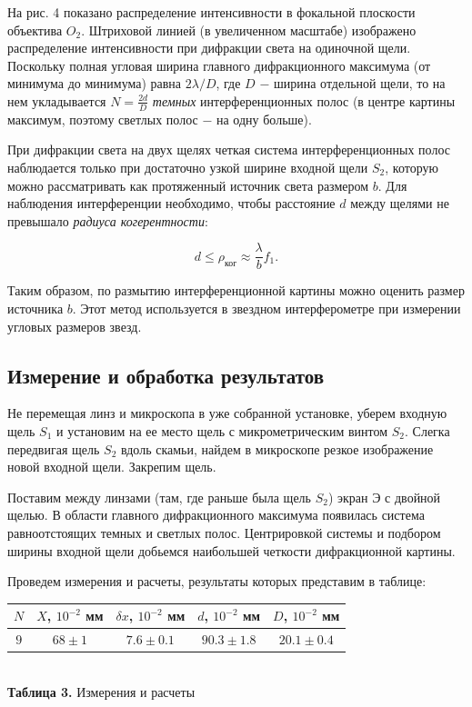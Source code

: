 \documentclass[a4paper,12pt]{article} %
\begin{document}
\hfill \break На рис. 4 показано распределение интенсивности в фокальной плоскости объектива $O_2$. Штриховой линией (в увеличенном масштабе) изображено распределение интенсивности при дифракции света на одиночной щели. Поскольку полная угловая ширина главного дифракционного максимума (от минимума до минимума) равна $2\lambda/D$, где $D$ $-$ ширина отдельной щели, то на нем укладывается $N = \frac {2d} {D}$ \textit{темных} интерференционных полос (в центре картины максимум, поэтому светлых полос $-$ на одну больше).

\hfill \break При дифракции света на двух щелях четкая система интерференционных полос наблюдается только при достаточно узкой ширине входной щели $S_2$, которую можно рассматривать как протяженный источник света размером $b$. Для наблюдения интерференции необходимо, чтобы расстояние $d$ между щелями не превышало \textit{радиуса когерентности}:

\begin{equation}\label{ linkname }
d \le \rho_{\text{ког}} \approx \frac{\lambda}{b} f_1.
\end{equation}

\hfill \break Таким образом, по размытию интерференционной картины можно оценить размер источника $b$. Этот метод используется в звездном интерферометре при измерении угловых размеров звезд.

\subsection{Измерение и обработка результатов}

\hfill \break Не перемещая линз и микроскопа в уже собранной установке, уберем входную щель $S_1$ и установим на ее место щель с микрометрическим винтом $S_2$. Слегка передвигая щель $S_2$ вдоль скамьи, найдем в микроскопе резкое изображение новой входной щели. Закрепим щель.

\hfill \break Поставим между линзами (там, где раньше была щель $S_2$) экран Э с двойной щелью. В области главного дифракционного максимума появилась система равноотстоящих темных и светлых полос. Центрировкой системы и подбором ширины входной щели добьемся наибольшей четкости дифракционной картины. 

\hfill \break Проведем измерения и расчеты, результаты которых представим в таблице:

\begin{center}
\begin{tabular}{|c|c|c|c|c|}\hline
$ N $ & $ X $, $10^{-2}$ мм & $ \delta x $, $ 10^{-2} $ мм & $ d $, $ 10^{-2}$ мм & $ D $, $ 10^{-2} $ мм \\\hline
$ 9 $ & $ 68 \pm 1 $ & $ 7.6 \pm 0.1 $ & $ 90.3 \pm 1.8 $ & $ 20.1 \pm 0.4 $ \\\hline
\end{tabular} \\
\hfill \break \textbf {Таблица 3.} Измерения и расчеты \\
\end{center}
\end{document}
